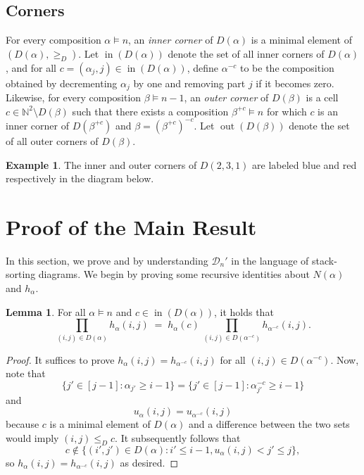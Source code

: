 \documentclass[12pt]{amsart}
\DeclareMathOperator{\inn}{in}
\DeclareMathOperator{\out}{out}
\theoremstyle{definition}
\newtheorem{example}[theorem]{Example}
\newtheorem{lemma}[theorem]{Lemma}
\begin{document}
\subsection*{Corners}
For every composition $\alpha\models n$, an \emph{inner corner} of $D(\alpha)$ is a minimal element of $(D(\alpha),\ge_D)$. Let $\inn(D(\alpha))$ denote the set of all inner corners of $D(\alpha)$, and for all $c=(\alpha_j, j)\in \inn(D(\alpha))$, define $\alpha^{-c}$ to be the composition obtained by decrementing $\alpha_j$ by one and removing part $j$ if it becomes zero. Likewise, for every composition $\beta\models n-1$, an \emph{outer corner} of $D(\beta)$ is a cell $c\in \mathbb{N}^2\setminus D(\beta)$ such that there exists a composition $\beta^{+c}\models n$ for which $c$ is an inner corner of $D(\beta^{+c})$ and $\beta = (\beta^{+c})^{-c}$. Let $\out(D(\beta))$ denote the set of all outer corners of $D(\beta)$.
\begin{example}
The inner and outer corners of $D(2,3,1)$ are labeled blue and red respectively in the diagram below.
\begin{figure}[ht]
\centering
\newcommand\dcell[3]{\draw[#3] (#1-1,-#2) rectangle (#1,1-#2);}
\label{fig:corners}
\end{figure}
\end{example}

\section{Proof of the Main Result}\label{sec:main}
In this section, we prove  and  by understanding $\mathcal{D}_n'$ in the language of stack-sorting diagrams. We begin by proving some recursive identities about $N(\alpha)$ and $h_{\alpha}$.

\begin{lemma}\label{lem:factorization}
For all $\alpha\models n$ and $c\in\inn(D(\alpha))$, it holds that
\[\prod_{(i,j)\in D(\alpha)}h_\alpha(i,j) \;=\; h_\alpha(c)\,\prod_{(i,j)\in D(\alpha^{-c})}h_{\alpha^{-c}}(i,j).\]
\end{lemma}
\begin{proof}
It suffices to prove $h_{\alpha}(i,j)=h_{\alpha^{-c}}(i,j)$ for all $(i,j)\in D(\alpha^{-c})$. Now, note that
\[\{j'\in [j-1]: \alpha_{j'}\ge i-1\} = \{j'\in [j-1]: \alpha^{-c}_{j'}\ge i-1\}\]
and
\[u_{\alpha}(i,j) = u_{\alpha^{-c}}(i,j)\]
because $c$ is a minimal element of $D(\alpha)$ and a difference between the two sets would imply $(i,j)\le_{D} c$. It subsequently follows that
\[c\notin \{(i',j')\in D(\alpha): i'\le i-1, u_{\alpha}(i,j)<j'\le j\},\]
so $h_{\alpha}(i,j)=h_{\alpha^{-c}}(i,j)$ as desired.
\end{proof}
\end{document}
